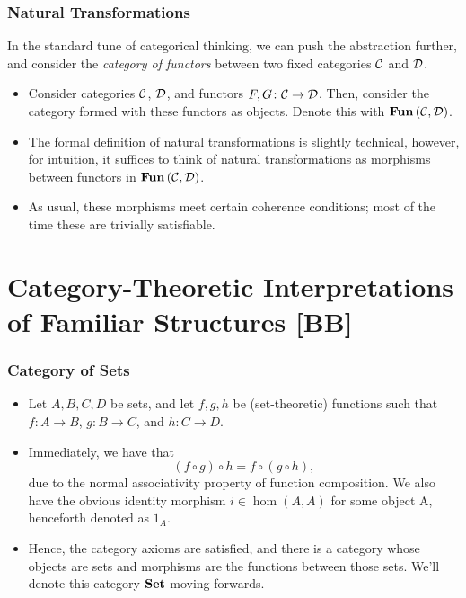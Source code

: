 \documentclass{beamer}
\numberwithin{figure}{section}
\begin{document}
\begin{frame}
        \frametitle{Natural Transformations}
        In the standard tune of categorical thinking, we can push the
        abstraction further, and consider the \emph{category of functors}
        between two fixed categories $\mathcal{C}$ and $\mathcal{D}$.
        \pause
        \begin{itemize}
                \item Consider categories $\mathcal{C}$, $\mathcal{D}$, and
                        functors $F, G \colon \mathcal{C} \to \mathcal{D}$. Then,
                        consider the category formed with these functors as
                        objects. Denote this with
                        $\operatorname{\mathbf{Fun}}{(\mathcal{C},\mathcal{D})}$.
                \item The formal definition of natural transformations is
                        slightly technical, however, for intuition, it suffices
                        to think of natural transformations as morphisms between
                        functors in $\operatorname{\mathbf{Fun}}{(\mathcal{C},\mathcal{D})}$.
                \item As usual, these morphisms meet certain coherence
                        conditions; most of the time these are trivially
                        satisfiable.
        \end{itemize}
\end{frame}

\section{Category-Theoretic Interpretations of Familiar Structures [BB]}
\begin{frame}
        \frametitle{Category of Sets}
        \begin{itemize}
                \item Let $A,B,C,D$ be sets, and let $f,g,h$ be (set-theoretic)
                        functions such that $f \colon A \to B$, $g \colon B \to
                        C$, and $h \colon C \to D$.
                \item Immediately, we have that
                        \begin{equation*}
                                \left( f \circ g \right) \circ h = f \circ
                                \left( g \circ h \right),
                        \end{equation*}
                        due to the normal associativity property of function
                        composition. We also have the obvious identity morphism
                        $i \in \hom(A,A)$ for some object A, henceforth
                        denoted as $1_A$.
                \item Hence, the category axioms are satisfied, and there is a
                        category whose objects are sets and morphisms are the
                        functions between those sets. We'll denote this category
                        $\operatorname{\mathbf{Set}}$ moving forwards.
        \end{itemize}
\end{frame}
\end{document}
